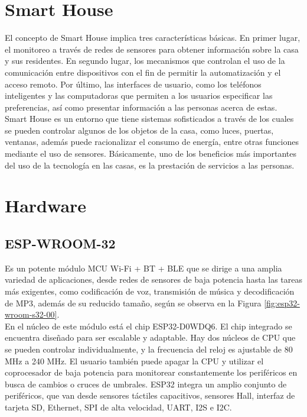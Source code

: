 \section{Smart House}

El concepto de Smart House implica tres características básicas. En primer lugar, el monitoreo a través de redes de sensores para obtener información sobre la casa y sus residentes. En segundo lugar, los mecanismos que controlan el uso de la comunicación entre dispositivos con el fin de permitir la automatización y el acceso remoto. Por último, las interfaces de usuario, como los teléfonos inteligentes y las computadoras que permiten a los usuarios especificar las preferencias, así como presentar información a las personas acerca de estas. \\

Smart House es un entorno que tiene sistemas sofisticados a través de los cuales se pueden controlar algunos de los objetos de la casa, como luces, puertas, ventanas, además puede racionalizar el consumo de energía, entre otras funciones mediante el uso de sensores. Básicamente, uno de los beneficios más importantes del uso de la tecnología en las casas, es la prestación de servicios a las personas.\cite{Howedi2016} 

\section{Hardware}

\subsection{ESP-WROOM-32}

Es un potente módulo MCU Wi-Fi + BT + BLE que se dirige a una amplia variedad de aplicaciones, desde redes de sensores de baja potencia hasta las tareas más exigentes, como codificación de voz, transmisión de música y decodificación de MP3, además de su reducido tamaño, según se observa en la Figura \ref{fig:esp32-wroom-s32-00}.\\

En el núcleo de este módulo está el chip ESP32-D0WDQ6. El chip integrado se encuentra diseñado para ser escalable y adaptable. Hay dos núcleos de CPU que se pueden controlar individualmente, y la frecuencia del reloj es ajustable de 80 MHz a 240 MHz. El usuario también puede apagar la CPU y utilizar el coprocesador de baja potencia para monitorear constantemente los periféricos en busca de cambios o cruces de umbrales. ESP32 integra un amplio conjunto de periféricos, que van desde sensores táctiles capacitivos, sensores Hall, interfaz de tarjeta SD, Ethernet, SPI de alta velocidad, UART, I2S e I2C.\\

